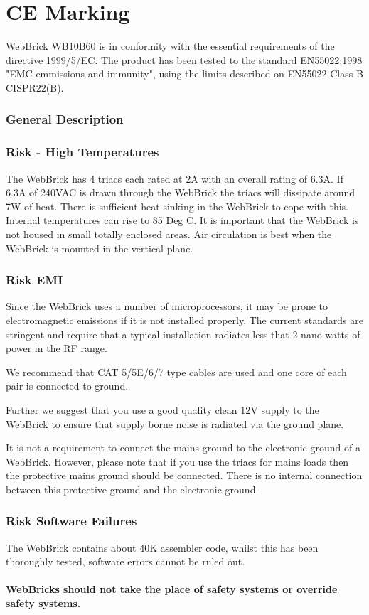 \section{CE Marking}


WebBrick WB10B60 is in conformity with the essential requirements of the directive 1999/5/EC. The product has been tested
 to the standard EN55022:1998 "EMC emmissions and immunity", using the limits described on EN55022 Class B CISPR22(B).


\subsubsection{General Description}


\subsubsection{Risk - High Temperatures}

The WebBrick has 4 triacs each rated at 2A with an overall rating of 6.3A.  If 6.3A of 240VAC is drawn through the WebBrick
the triacs will dissipate around 7W of heat.  There is sufficient heat sinking in the WebBrick to cope with this.  Internal temperatures
can rise to 85 Deg C.  It is important that the WebBrick is not housed in small totally enclosed areas.  Air circulation is best when the 
WebBrick is mounted in the vertical plane.


\subsubsection{Risk EMI}

Since the WebBrick uses a number of microprocessors, it may be prone to electromagnetic emissions if it is not installed properly.  The current
standards are stringent and require that a typical installation radiates less that 2 nano watts of power in the RF range.

We recommend that CAT 5/5E/6/7 type cables are used and one core of each pair is connected to ground.

Further we suggest that you use a good quality clean 12V supply to the WebBrick to ensure that supply borne noise is radiated via the ground plane.

It is not a requirement to connect the mains ground to the electronic ground of a WebBrick.  However, please note that if you use the triacs for 
mains loads then the protective mains ground should be connected.  There is no internal connection between this protective ground and the 
electronic ground.


\subsubsection{Risk Software Failures}

The WebBrick contains about 40K assembler code, whilst this has been thoroughly tested, 
software errors cannot be ruled out.

\paragraph{WebBricks should not take the place of safety systems or override safety systems.}

